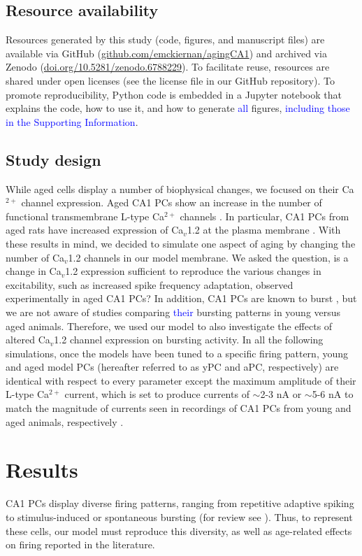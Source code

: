 \documentclass[10pt,letterpaper]{article}
\newcommand{\Ca}{Ca$^{2+}$}
\newcommand{\edit}[1]{\textcolor{blue}{#1}}
\begin{document}
\subsection*{Resource availability}
Resources generated by this study (code, figures, and manuscript files) are available via GitHub (\href{https://github.com/emckiernan/agingCA1}{github.com/emckiernan/agingCA1}) and archived via Zenodo (\href{https://doi.org/10.5281/zenodo.6788229}{doi.org/10.5281/zenodo.6788229}). To facilitate reuse, resources are shared under open licenses (see the license file in our GitHub repository). To promote reproducibility, Python code is embedded in a Jupyter notebook \cite{kluyver2016jupyter} that explains the code, how to use it, and how to generate \edit{all} figures, \edit{including those in the Supporting Information}.

\subsection*{Study design}
While aged cells display a number of biophysical changes, we focused on their {\Ca} channel expression. Aged CA1 PCs show an increase in the number of functional transmembrane L-type {\Ca} channels  \cite{herman1998up,thibault1996increase,veng2002regionally}. In particular, CA1 PCs from aged rats have increased expression of Ca$_v$1.2 at the plasma membrane \cite{nunez2014surface}. With these results in mind, we decided to simulate one aspect of aging by changing the number of Ca$_v$1.2 channels in our model membrane. We asked the question, is a change in Ca$_v$1.2 expression sufficient to reproduce the various changes in excitability, such as increased spike frequency adaptation, observed experimentally in aged CA1 PCs? In addition, CA1 PCs are known to burst \cite{mckiernan2017ca1}, but we are not aware of studies comparing \edit{their} bursting patterns in young versus aged animals. Therefore, we used our model to also investigate the effects of altered Ca$_v$1.2 channel expression on bursting activity. In all the following simulations, once the models have been tuned to a specific firing pattern, young and aged model PCs (hereafter referred to as yPC and aPC, respectively) are identical with respect to every parameter except the maximum amplitude of their L-type {\Ca} current, which is set to produce currents of $\sim$2-3 nA or $\sim$5-6 nA to match the magnitude of currents seen in recordings of CA1 PCs from young and aged animals, respectively \cite{campbell1996aging}. 

\section*{Results}
CA1 PCs display diverse firing patterns, ranging from repetitive adaptive spiking to stimulus-induced or spontaneous bursting (for review see \cite{mckiernan2017ca1}). Thus, to represent these cells, our model must reproduce this diversity, as well as age-related effects on firing reported in the literature.  
\end{document}
